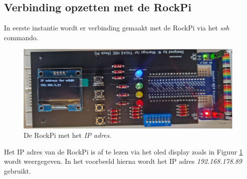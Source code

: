 \subsection{Verbinding opzetten met de RockPi}\label{chp:contactPi}

In eerste instantie wordt er verbinding gemaakt met de RockPi via het \textit{ssh} commando.
\begin{figure}[h!]
	\centering
	\begin{center} 	
		\includegraphics[width=1\textwidth]{figuren/rockIPnr}
		\caption{De RockPi met het \textit{IP adres.}}
		\label{fig:rockpiip}   
	\end{center}
\end{figure}
 Het IP adres van de RockPi is af te lezen via het oled display zoals in Figuur \ref{fig:rockpiip} wordt weergegeven. In het voorbeeld hierna wordt het IP adres \textit{192.168.178.89} gebruikt.



